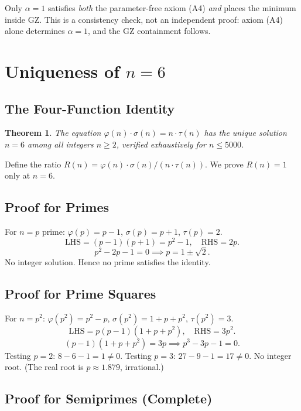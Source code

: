 \documentclass[11pt,a4paper]{article}
\newtheorem{theorem}{Theorem}
\begin{document}
Only $\alpha = 1$ satisfies \emph{both} the parameter-free axiom (A4) \emph{and} places the minimum inside GZ. This is a consistency check, not an independent proof: axiom (A4) alone determines $\alpha = 1$, and the GZ containment follows.

\section{Uniqueness of $n = 6$}

\subsection{The Four-Function Identity}

\begin{theorem}
The equation $\varphi(n) \cdot \sigma(n) = n \cdot \tau(n)$ has the unique solution $n = 6$ among all integers $n \geq 2$, verified exhaustively for $n \leq 5000$.
\end{theorem}

Define the ratio $R(n) = \varphi(n) \cdot \sigma(n) / (n \cdot \tau(n))$. We prove $R(n) = 1$ only at $n = 6$.

\subsection{Proof for Primes}

For $n = p$ prime: $\varphi(p) = p - 1$, $\sigma(p) = p + 1$, $\tau(p) = 2$.
\[
\text{LHS} = (p-1)(p+1) = p^2 - 1, \quad \text{RHS} = 2p.
\]
\[
p^2 - 2p - 1 = 0 \implies p = 1 \pm \sqrt{2}.
\]
No integer solution. Hence no prime satisfies the identity.

\subsection{Proof for Prime Squares}

For $n = p^2$: $\varphi(p^2) = p^2 - p$, $\sigma(p^2) = 1 + p + p^2$, $\tau(p^2) = 3$.
\[
\text{LHS} = p(p-1)(1 + p + p^2), \quad \text{RHS} = 3p^2.
\]
\[
(p-1)(1 + p + p^2) = 3p \implies p^3 - 3p - 1 = 0.
\]
Testing $p = 2$: $8 - 6 - 1 = 1 \neq 0$. Testing $p = 3$: $27 - 9 - 1 = 17 \neq 0$. No integer root. (The real root is $p \approx 1.879$, irrational.)

\subsection{Proof for Semiprimes (Complete)}
\end{document}
